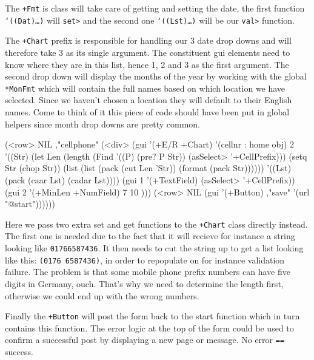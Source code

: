 The \texttt{+Fmt} is class will take care of getting and setting the
date, the first function \texttt{‘((Dat)\dots{})} will \texttt{set>}
and the second one \texttt{‘((Lst)\dots{})} will be our \texttt{val>}
function.

The \texttt{+Chart} prefix is responsible for handling our 3 date drop
downs and will therefore take 3 as its single argument. The
constituent gui elements need to know where they are in this list,
hence 1, 2 and 3 as the first argument. The second drop down will
display the months of the year by working with the global
\texttt{*MonFmt} which will contain the full names based on which
location we have selected. Since we haven't chosen a location they
will default to their English names. Come to think of it this piece of
code should have been put in global helpers since month drop downs are
pretty common.

\begin{wideverbatim}
(<row> NIL ,"cellphone" 
   (<div> 
      (gui '(+E/R +Chart) '(cellnr : home obj) 2 
         '((Str)
             (let Len 
                (length 
                   (Find '((P) (pre? P Str)) (asSelect> '+CellPrefix)))
                (setq Str (chop Str))
                (list 
                   (list (pack (cut Len 'Str)) (format (pack Str))))))
         '((Lst) (pack (caar Lst) (cadar Lst))))
      (gui 1 '(+TextField) (asSelect> '+CellPrefix))
      (gui 2 '(+MinLen +NumField) 7 10 )))
(<row> NIL (gui '(+Button) ,"save" '(url "@start"))))))
\end{wideverbatim}

Here we pass two extra set and get functions to the \texttt{+Chart}
class directly instead. The first one is needed due to the fact that
it will recieve for instance a string looking like
\texttt{01766587436}. It then needs to cut the string up to get a list
looking like this: \texttt{(0176 6587436)}, in order to repopulate on
for instance validation failure. The problem is that some mobile phone
prefix numbers can have five digits in Germany, ouch. That's why we
need to determine the length first, otherwise we could end up with the
wrong numbers.

Finally the \texttt{+Button} will post the form back to the start
function which in turn contains this function. The error logic at the
top of the form could be used to confirm a successful post by
displaying a new page or message. No error \texttt{==} success.

